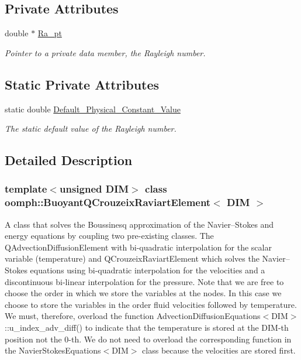 \subsection*{Private Attributes}
\begin{DoxyCompactItemize}
\item 
double $\ast$ \hyperlink{classoomph_1_1BuoyantQCrouzeixRaviartElement_a054ffb965ec8cce9b6b2da2336a1e7d8}{Ra\+\_\+pt}
\begin{DoxyCompactList}\small\item\em Pointer to a private data member, the Rayleigh number. \end{DoxyCompactList}\end{DoxyCompactItemize}
\subsection*{Static Private Attributes}
\begin{DoxyCompactItemize}
\item 
static double \hyperlink{classoomph_1_1BuoyantQCrouzeixRaviartElement_a3214e603f9b4108348c6a9abcede67ac}{Default\+\_\+\+Physical\+\_\+\+Constant\+\_\+\+Value}
\begin{DoxyCompactList}\small\item\em The static default value of the Rayleigh number. \end{DoxyCompactList}\end{DoxyCompactItemize}


\subsection{Detailed Description}
\subsubsection*{template$<$unsigned D\+IM$>$\newline
class oomph\+::\+Buoyant\+Q\+Crouzeix\+Raviart\+Element$<$ D\+I\+M $>$}

A class that solves the Boussinesq approximation of the Navier--Stokes and energy equations by coupling two pre-\/existing classes. The Q\+Advection\+Diffusion\+Element with bi-\/quadratic interpolation for the scalar variable (temperature) and Q\+Crouzeix\+Raviart\+Element which solves the Navier--Stokes equations using bi-\/quadratic interpolation for the velocities and a discontinuous bi-\/linear interpolation for the pressure. Note that we are free to choose the order in which we store the variables at the nodes. In this case we choose to store the variables in the order fluid velocities followed by temperature. We must, therefore, overload the function Advection\+Diffusion\+Equations$<$\+D\+I\+M$>$\+::u\+\_\+index\+\_\+adv\+\_\+diff() to indicate that the temperature is stored at the D\+I\+M-\/th position not the 0-\/th. We do not need to overload the corresponding function in the Navier\+Stokes\+Equations$<$\+D\+I\+M$>$ class because the velocities are stored first. 

